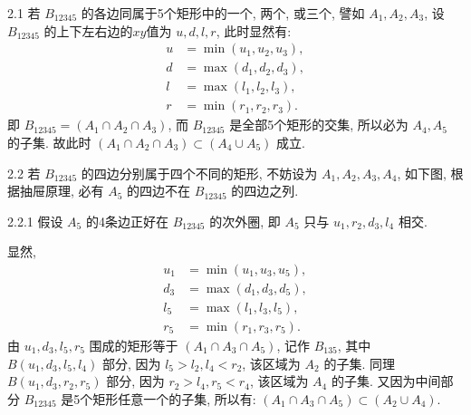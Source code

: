 2.1 若 $B_{12345}$ 的各边同属于5个矩形中的一个, 两个, 或三个, 譬如 $A_1, A_2, A_3$, 设 $B_{12345}$ 的上下左右边的$xy$值为 $u,d,l,r$, 此时显然有:
\begin{align*}
u &= \min(u_1, u_2, u_3), \\
d &= \max(d_1, d_2, d_3), \\
l &= \max(l_1, l_2, l_3), \\
r &= \min(r_1, r_2, r_3).
\end{align*}
即 $B_{12345} = (A_1\cap A_2\cap A_3)$, 而 $B_{12345}$ 是全部5个矩形的交集, 所以必为 $A_4, A_5$ 的子集. 故此时 $(A_1\cap A_2\cap A_3) \subset (A_4\cup A_5)$ 成立. 

2.2 若 $B_{12345}$ 的四边分别属于四个不同的矩形, 不妨设为 $A_1, A_2, A_3, A_4$, 如下图, 根据抽屉原理, 必有 $A_5$ 的四边不在 $B_{12345}$ 的四边之列.

2.2.1 假设 $A_5$ 的4条边正好在 $B_{12345}$ 的次外圈, 即 $A_5$ 只与 $u_1, r_2, d_3, l_4$ 相交.
\begin{figure*}[htbp]
\centering
{}
\end{figure*}

显然, 
\begin{align*}
u_1 &= \min(u_1, u_3, u_5), \\
d_3 &= \max(d_1, d_3, d_5), \\
l_5 &= \max(l_1, l_3, l_5), \\
r_5 &= \min(r_1, r_3, r_5).
\end{align*}
由 $u_1, d_3, l_5, r_5$ 围成的矩形等于 $(A_1\cap A_3\cap A_5)$, 记作 $B_{135}$, 其中 $B(u_1, d_3, l_5, l_4)$ 部分, 因为 $l_5 > l_2, l_4 < r_2$, 该区域为 $A_2$ 的子集. 同理 $B(u_1, d_3, r_2, r_5)$ 部分, 因为 $r_2>l_4, r_5<r_4$, 该区域为 $A_4$ 的子集. 又因为中间部分 $B_{12345}$ 是5个矩形任意一个的子集, 所以有: $(A_1\cap A_3\cap A_5) \subset (A_2\cup A_4)$. 

